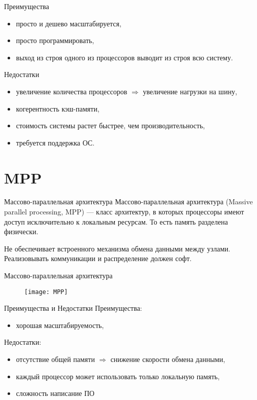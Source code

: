 \begin{frame}{Преимущества}
\begin{itemize}
    \item просто и дешево масштабируется,
    \item просто программировать,
    \item выход из строя одного из процессоров выводит из строя всю систему.
\end{itemize}
\end{frame}

\begin{frame}{Недостатки}
\begin{itemize}
    \item увеличение количества процессоров $\Rightarrow$ увеличение нагрузки на шину,
    \item когерентность кэш-памяти,
    \item стоимость системы растет быстрее, чем производительность,
    \item требуется поддержка ОС.
\end{itemize}
\end{frame}

\section{MPP}

\begin{frame}{Массово-параллельная архитектура}
Массово-параллельная архитектура (\abbr Massive parallel processing, MPP) --- класс архитектур, в которых процессоры имеют доступ исключительно к локальным ресурсам. То есть память разделена физически.

Не обеспечивает встроенного механизма обмена данными между узлами. Реализовывать коммуникации и распределение должен софт.
\end{frame}

\begin{frame}{Массово-параллельная архитектура}
\begin{figure}[htpb]
    \centering
    \texttt{[image: MPP]}
\end{figure}
\end{frame}

\begin{frame}{Преимущества и Недостатки}
Преимущества:
\begin{itemize}
    \item хорошая масштабируемость,
\end{itemize}
\vfill
Недостатки:
\begin{itemize}
    \item отсутствие общей памяти $\Rightarrow$ снижение скорости обмена данными,
    \item каждый процессор может использовать только локальную память,
    \item сложность написание ПО
\end{itemize}
\end{frame}

